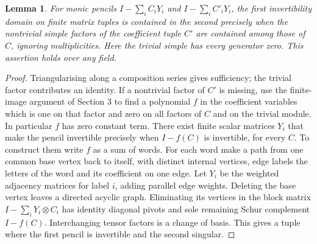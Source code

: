 \documentclass[11pt]{article}
\newtheorem{lemma}[theorem]{Lemma}
\begin{document}
\begin{lemma}\label{monic}
For monic pencils $I-\sum_i C_iY_i$ and $I-\sum_i C'_iY_i$, the first
invertibility domain on finite matrix tuples is contained in the second
precisely when the nontrivial simple factors of the coefficient tuple $C'$
are contained among those of $C$, ignoring multiplicities. Here the
trivial simple has every generator zero. This assertion holds over any field.
\end{lemma}
\begin{proof}
Triangularising along a composition series gives sufficiency; the trivial
factor contributes an identity. If a nontrivial factor of $C'$ is missing,
use the finite-image argument of Section 3 to find a polynomial $f$ in
the coefficient variables which is one on that factor and zero on all
factors of $C$ and on the trivial module. In particular $f$ has zero
constant term. There exist finite scalar matrices $Y_i$ that make the
pencil invertible precisely when $I-f(C)$ is invertible, for every $C$.
To construct them write $f$ as a sum of words. For each word make a
path from one common base vertex back to itself, with distinct internal
vertices, edge labels the letters of the word and its coefficient on one
edge. Let $Y_i$ be the weighted adjacency matrices for label $i$, adding
parallel edge weights. Deleting the base vertex leaves a directed acyclic
graph. Eliminating its vertices in the block matrix $I-\sum_iY_i\otimes C_i$
has identity diagonal pivots and sole remaining Schur complement $I-f(C)$.
Interchanging tensor factors is a change of basis. This gives a tuple
where the first pencil is invertible and the second singular.
\end{proof}
\end{document}
